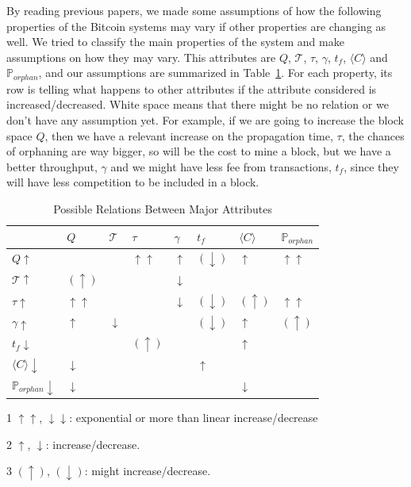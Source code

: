 \documentclass[USenglish]{uit-thesis}
\begin{document}
By reading previous papers, we made some assumptions of how
the following properties of the Bitcoin systems may vary if other
properties are changing as well. We tried to classify the main
properties of the system and make assumptions on how they
may vary. This attributes are $Q$, $\mathcal{T}$, $\tau$,
$\gamma$, $t_f$, $\langle C\rangle$ and $\mathbb{P}_{orphan}$, and
our assumptions are summarized in Table~\ref{tab:possiblerelations}. For
each property, its row is telling what happens to other attributes
if the attribute considered is increased/decreased. White space
means that there might be no relation or we don't have any assumption
yet. For example, if we are going to increase the block space $Q$,
then we have a relevant increase on the propagation time, $\tau$,
the chances of orphaning are way bigger, so will be the cost to mine a block,
but we have a better throughput, $\gamma$ and we might have
less fee from transactions, $t_f$, since they will have less competition
to be included in a block.
\begin{table}
	\begin{threeparttable}
	\caption{Possible Relations Between Major Attributes}
	\label{tab:possiblerelations}
	\begin{tabular}{|p{1.5cm}|p{1.1cm}|p{1.1cm}|p{1.1cm}|p{1.1cm}|p{1.1cm}|p{1.1cm}|p{1.1cm}|} \hline
		\centering
		&\textbf{$Q$}&\textbf{$\mathcal{T}$}&\textbf{$\tau$}&\textbf{$\gamma$}&	\textbf{$t_f$}&\textbf{$\langle C\rangle$}&	\textbf{$\mathbb{P}_{orphan}$} \\
		\hline
		\textbf{$Q\uparrow$}& \cellcolor{gray!25}& &$\uparrow\uparrow$ &$\uparrow$ &$(\downarrow)$ &$\uparrow$ &$\uparrow\uparrow$\\
		\hline
		 \textbf{$\mathcal{T}\uparrow$}&$(\uparrow)$&\cellcolor{gray!25}&&$\downarrow$&&&\\
		\hline
		\textbf{$\tau\uparrow$}&$\uparrow\uparrow$&&\cellcolor{gray!25}&$\downarrow$&$(\downarrow)$&$(\uparrow)$&$\uparrow$$\uparrow$ \\
		\hline
		\textbf{$\gamma\uparrow$}&$\uparrow$&$\downarrow$&&\cellcolor{gray!25}&$(\downarrow)$&$\uparrow$&$(\uparrow)$ \\
		\hline
		\textbf{$t_f\downarrow$}&&&$(\uparrow)$&&\cellcolor{gray!25}&$\uparrow$&\\
		\hline
		\textbf{$\langle C\rangle\downarrow$}&$\downarrow$&&&&$\uparrow$&\cellcolor{gray!25}&\\
		\hline
	\textbf{$\mathbb{P}_{orphan}\downarrow$}&$\downarrow$&&&&&$\downarrow$& \cellcolor{gray!25}\\
		\hline
	\end{tabular}
 \begin{tablenotes}
 	\item[1] $\uparrow\uparrow$, $\downarrow\downarrow$: exponential or more than linear
 	increase/decrease
	\item[2] $\uparrow$, $\downarrow$: increase/decrease.
	\item[3] $(\uparrow)$, $(\downarrow)$: might increase/decrease.

\end{tablenotes}
\end{threeparttable}
\end{table}
\end{document}
